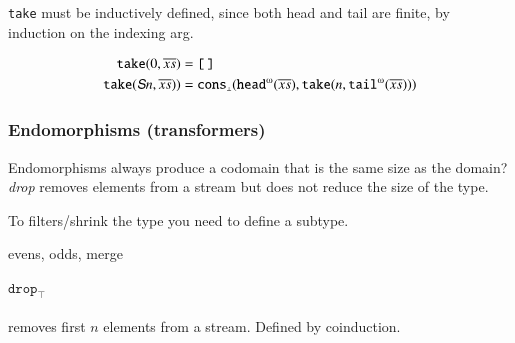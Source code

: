 \begin{prooftree}
\end{prooftree}

\texttt{take} must be inductively defined, since both head and tail
are finite, by induction on the indexing arg.

\begin{align} %
  \texttt{take}(0,\coseq{x}) &= \nillist \\
  \texttt{take}(\SNat{}n,\coseq{x})) &=
  \defnup{\Cons}(\cohead(\coseq{x}),\texttt{take}(n,\cotail(\coseq{x}))) \label{take:ind}
\end{align} %


\subsubsection{Endomorphisms (transformers)}

Endomorphisms always produce a codomain that is the same size as the
domain? \textit{drop} removes elements from a stream but does not
reduce the size of the type.

To filters/shrink the type you need to define a subtype.

 evens, odds, merge

\paragraph{\(\texttt{drop}_{\scriptscriptstyle\top}\)}
removes first \(n\) elements from a stream. Defined by coinduction.

\begin{prooftree}
\end{prooftree}



